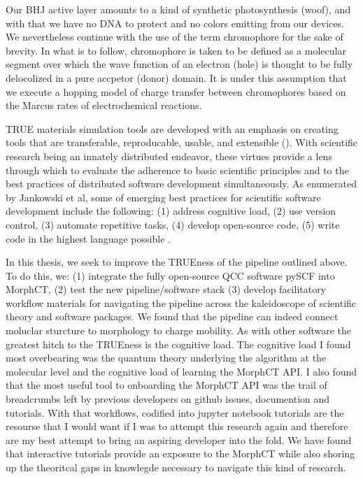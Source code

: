 Our BHJ active layer amounts to a kind of synthetic photosynthesis (woof), and with that we have no DNA to
protect and no colors emitting from our devices. We nevertheless continue with the use of the term chromophore
for the sake of brevity. In what is to follow, chromophore is taken to be defined as a molecular segment over which the 
wave function of an electron (hole) is thought to be fully delocolized in a pure accpetor (donor) domain. 
It is under this assumption that we execute a hopping model of charge transfer between
chromophores based on the Marcus rates of electrochemical reactions.  

TRUE materials simulation tools are developed with an emphasis on creating tools that are
transferable, reproducable, usable, and extensible (\cite{Cummings2017}).
With scientific research being an innately distributed endeavor, these virtues provide a lens through which to
evaluate the adherence to basic scientific principles and to the best practices of distributed software development
simultaneously. As enumerated by Jankowski et al, some of emerging best practices for scientific software
development include the following: (1) address cognitive load, (2) use version control, (3) automate
repetitive tasks, (4) develop open-source code, (5) write code in the highest language possible
\cite{Jankowski2020}.


In this thesis, we seek to improve the TRUEness of the pipeline outlined above.
To do this, we: (1) integrate the fully open-source QCC software pySCF into MorphCT,
(2) test the new pipeline/software stack (3) develop facilitatory workflow materials for navigating the
pipeline across the kaleidoscope of scientific theory and software packages. 
We found that the pipeline can indeed connect moluclar sturcture to morphology to charge
mobility. As with other software the greatest hitch to the TRUEness is the
cognitive load. The cognitive load I found most overbearing was the quantum theory underlying the algorithm 
at the molecular level and the cognitive load of learning the MorphCT API. 
I also found that the most useful tool to onboarding the MorphCT API was the
trail of breadcrumbs left by previous developers on github issues, documention and tutorials. 
With that workflows, codified into jupyter notebook tutorials are the resourse that I would want if I was to
attempt this research again and therefore are my best attempt to bring an aspiring developer into the fold.
We have found that interactive tutorials provide an exposure to the MorphCT while also shoring up the
theoritcal gaps in knowlegde necessary to navigate this kind of research. 

